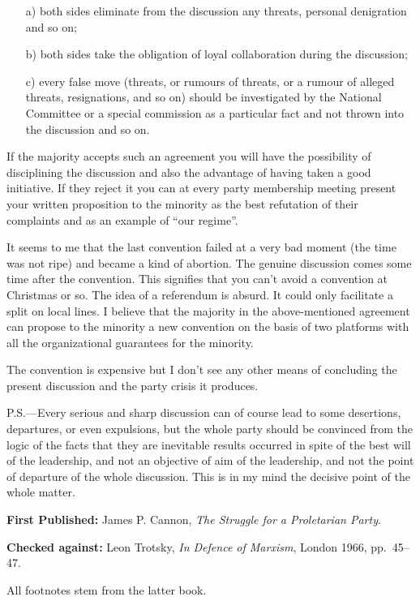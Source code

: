 \begin{enumerate}
  \item[a)] both sides eliminate from the discussion any threats, personal denigration and so on;
  \item[b)] both sides take the obligation of loyal collaboration during the discussion;
  \item[c)] every false move (threats, or rumours of threats, or a rumour of alleged threats, resignations, and so on) should be investigated by the National Committee or a special commission as a particular fact and not thrown into the discussion and so on.
\end{enumerate}

If the majority accepts such an agreement you will have the possibility of disciplining the discussion and also the advantage of having taken a good initiative. If they reject it you can at every party membership meeting present your written proposition to the minority as the best refutation of their complaints and as an example of “our regime”.

It seems to me that the last convention failed at a very bad moment (the time was not ripe) and became a kind of abortion. The genuine discussion comes some time after the convention. This signifies that you can’t avoid a convention at Christmas or so. The idea of a referendum is absurd. It could only facilitate a split on local lines. I believe that the majority in the above-mentioned agreement can propose to the minority a new convention on the basis of two platforms with all the organizational guarantees for the minority.

The convention is expensive but I don’t see any other means of concluding the present discussion and the party crisis it produces.


\begin{postscriptum}
  P.S.---Every serious and sharp discussion can of course lead to some desertions, departures, or even expulsions, but the whole party should be convinced from the logic of the facts that they are inevitable results occurred in spite of the best will of the leadership, and not an objective of aim of the leadership, and not the point of departure of the whole discussion. This is in my mind the decisive point of the whole matter.
\end{postscriptum}

\begin{letterinfo}
  \textbf{First Published:} James P. Cannon, \emph{The Struggle for a Proletarian Party}.
  
  \textbf{Checked against:} Leon Trotsky, \emph{In Defence of Marxism}, London 1966, pp.~45--47.
  
  All footnotes stem from the latter book.
\end{letterinfo}